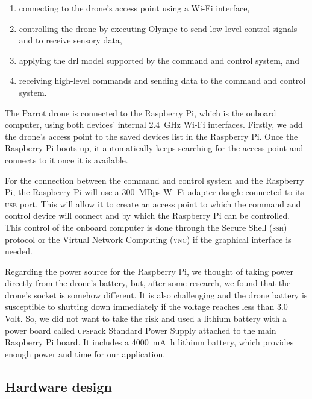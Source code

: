 \documentclass[../main.tex]{subfiles}
\begin{document}
\begin{enumerate}
    \item connecting to the drone's access point 
        using a Wi-Fi interface,
    \item controlling the drone 
        by executing Olympe to send low-level control signals 
        and to receive sensory data,
    \item applying the \gls{drl} model supported by 
        the command and control system, and
    \item receiving high-level commands and 
        sending data to the command and control system.
\end{enumerate}
 
The Parrot \anafi drone is connected 
to the Raspberry Pi, which is the onboard computer,
using both devices' internal 
\SI{2.4}{\giga\hertz}
Wi-Fi interfaces. 
Firstly, we add the \anafi drone's access point 
to the saved devices list in the Raspberry Pi.
Once the Raspberry Pi boots up, it automatically keeps 
searching for the access point and connects 
to it once it is available.

For the connection between the command and control system 
and the Raspberry Pi, 
the Raspberry Pi will use a 
\SI[per-mode=symbol,per-symbol=p]{300}{MBps} 
Wi-Fi adapter dongle connected to 
its \textsc{usb} port. 
This will allow it to create an access point
to which the command and control device 
will connect and by which the Raspberry Pi can be controlled.
This control of the onboard computer 
is done through the Secure Shell (\textsc{ssh})
protocol or the Virtual Network Computing (\textsc{vnc})
if the graphical interface is needed. 

Regarding the power source for the Raspberry Pi, 
we thought of taking power directly from the 
drone's battery, but, after some research, we found 
that the \anafi drone's  
socket is somehow different. It is also challenging 
and the drone battery is susceptible to shutting down 
immediately if the voltage reaches less than 3.0 Volt. 
So, we did not want to take the risk and used a 
lithium battery with a power board called 
\textsc{upsp}ack Standard Power Supply attached to 
the main Raspberry Pi board. It includes a 
\SI{4000}{\milli\ampere\hour}
lithium battery, which provides enough power 
and time for our application.

\subsection{Hardware design}
\end{document}

